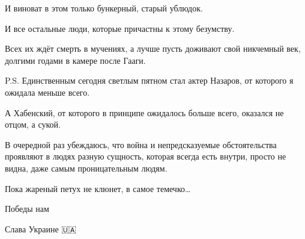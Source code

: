 И виноват в этом только бункерный, старый ублюдок.

И все остальные люди, которые причастны к этому безумству.

Всех их ждёт смерть в мучениях, а лучше пусть доживают свой никчемный век,
долгими годами в камере после Гааги.

P.S.  Единственным сегодня светлым пятном стал актер Назаров, от которого я
ожидала меньше всего.

А Хабенский, от которого в принципе ожидалось больше всего, оказался не отцом,
а сукой.

В очередной раз убеждаюсь, что война и непредсказуемые обстоятельства проявляют
в людях разную сущность, которая всегда есть внутри, просто не видна, даже
самым проницательным людям.

Пока жареный петух не клюнет, в самое темечко…

Победы нам

Слава Украине 🇺🇦
